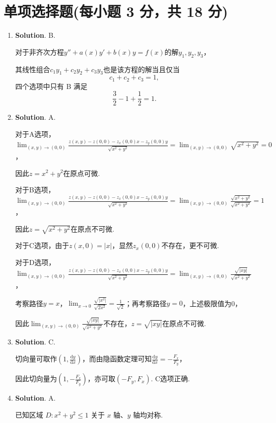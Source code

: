\documentclass[../main.tex]{subfiles}
\begin{document}
\section{单项选择题(每小题 3 分，共 18 分)}
\begin{enumerate}
    \item \textbf{Solution}. B.

          对于非齐次方程$y''+a(x)y'+b(x)y=f(x)$的解$y_1,y_2,y_3$，

          其线性组合$c_1y_1+c_2y_2+c_3y_3$也是该方程的解当且仅当
          \[
              c_1+c_2+c_3=1,
          \]
          四个选项中只有 B 满足
          \[
              \frac32-1+\frac12=1.
          \]

    \item \textbf{Solution}. A.

          对于A选项，$\lim_{(x,y)\to(0,0)}\frac{z(x,y)-z(0,0)-z_x(0,0)x-z_y(0,0)y}{\sqrt{x^2+y^2}}=\lim_{(x,y)\to(0,0)}\sqrt{x^2+y^2}=0$，

          因此$z=x^2+y^2$在原点可微.

          对于B选项，$\lim_{(x,y)\to(0,0)}\frac{z(x,y)-z(0,0)-z_x(0,0)x-z_y(0,0)y}{\sqrt{x^2+y^2}}=\lim_{(x,y)\to(0,0)}\frac{\sqrt{x^2+y^2}}{\sqrt{x^2+y^2}}=1$，

          因此$z=\sqrt{x^2+y^2}$在原点不可微.

          对于C选项，由于$z(x,0)=|x|$，显然$z_x(0,0)$不存在，更不可微.

          对于D选项，$\lim_{(x,y)\to(0,0)}\frac{z(x,y)-z(0,0)-z_x(0,0)x-z_y(0,0)y}{\sqrt{x^2+y^2}}=\lim_{(x,y)\to(0,0)}\frac{\sqrt{|xy|}}{\sqrt{x^2+y^2}}$，

          考察路径$y=x$，$\lim_{x\to0}\frac{\sqrt{|x^2|}}{\sqrt{2x^2}}=\frac1{\sqrt2}$；再考察路径$y=0$，上述极限值为0，

          因此$\lim_{(x,y)\to(0,0)}\frac{\sqrt{|xy|}}{\sqrt{x^2+y^2}}$不存在，$z=\sqrt{|xy|}$在原点不可微.

    \item \textbf{Solution}. C.

          切向量可取作$\left(1,\frac{\mathrm{d}y}{\mathrm{d}x}\right)$，而由隐函数定理可知$\frac{\mathrm{d}y}{\mathrm{d}x}=-\frac{F_x}{F_y}$，

          因此切向量为$\left(1,-\frac{F_x}{F_y}\right)$，亦可取$\left(-F_y,F_x\right)$. C选项正确.

    \item \textbf{Solution}. A.

          已知区域 \(D:x^2+y^2\le1\) 关于 \(x\) 轴、\(y\) 轴均对称.


\end{enumerate}
\end{document}

